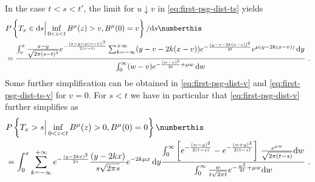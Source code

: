 %
In the case $  t < s< t' $, the limit for $ u \downarrow v $ in 
\eqref{eq:first-psg-dist-ts}
yields
%
\begin{align*}
&
P\left\{ T_x \in \mathrm d s \Big| \inf_{ 0 < z < t }B^\mu( z) > v, B^\mu(0) = v \right\} 
/ \mathrm d s
\numberthis \label{eq:first-psg-dist-ts-v}
\\
%
&=
\frac{\int_v^x 
	\frac{ x-y}
	{\sqrt{2 \pi (s-t)^3} } 
	e^{ - \frac{  |x- y - \mu (s-t)|^2} {2(s-t)} }
	\sum_{k = - \infty}^{+\infty}
	(y - v - 2k(x-v))
	e^{    -   \frac{(y - v - 2k(x-v))^2}{2t} } 
	e^{  \mu ( y  - 2k(x-v))}
	\, \mathrm d y}
{
	\int_0^\infty 
	(w-v) e^{- \frac{ (w - v)^2} { 2 t } + \mu w }  
	\, \mathrm d w
}\,\,.
\end{align*}
%
%
Some further simplification can be obtained in  \eqref{eq:first-psg-dist-v} and \eqref{eq:first-psg-dist-ts-v}
for $ v=0 $. For $ s < t  $ we have in particular that \eqref{eq:first-psg-dist-v}
further simplifies as 
\begin{align*}
&
P\left\{ T_x > s \Big| \inf_{ 0 < z < t }B^\mu( z) > 0, B^\mu(0) = 0 \right\} 
\numberthis \label{eq:first-psg-dist-0}
\\
&=
\int_0^x \sum_{k = - \infty}^{+\infty}
% 
e^{    -   \frac{(y  - 2kx)^2}{2 s} } 
\frac { (y -  2k x )}{s\sqrt{2 \pi s }}
e^{ -2 k \mu x}
\,   \mathrm d y
%
\frac{ 
	\int_0^\infty
	\left[
	e^{  - \frac{(w - y )^2}{  2 (t-s) }    }
	- 
	e^{  - \frac{  (w + y )^2}{ 2 (t-s) }    } \right]
	\, \frac{ e^{ \mu w}  }{\sqrt{2 \pi (t-s)} }
	 \mathrm d w
}{
	\int_0^\infty 
	\frac w {t \sqrt{2 \pi t} }
	e^{  - \frac{w^2}{2t} + \mu w   } 	 
	\mathrm d w
} \,\,  .
\end{align*}











